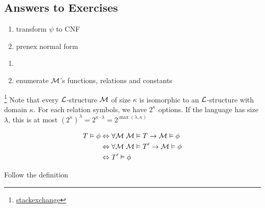 \documentclass[11pt]{article}
\begin{document}
\subsection{Answers to Exercises}
\label{sec:orgb25d3e8}
\begin{exercise}
\begin{enumerate}
\item transform \(\psi\) to CNF
\item prenex normal form
\end{enumerate}
\end{exercise}
\begin{exercise}
\begin{enumerate}
\item {}
\item enumerate \(\mathcal{M}\)'s functions, relations and constants
\end{enumerate}
\end{exercise}
\begin{exercise}
\footnote{\href{https://math.stackexchange.com/questions/1170953/let-alpha-be-any-cardinal-there-are-at-most-2-alpha-cup-mathscrl}{stackexchange}}
Note that every \(\mathcal{L}\)-structure \(\mathcal{M}\) of size \(\kappa\) is isomorphic to an
\(\mathcal{L}\)-structure with domain \(\kappa\). For each relation symbols, we have \(2^\kappa\)
options. If the language has size \(\lambda\), this is at most 
\((2^\kappa)^\lambda=2^{\kappa\cdot\lambda}=2^{\max(\lambda,\kappa)}\)
\end{exercise}

\begin{exercise}
\begin{align*}
T\vDash\phi&\Leftrightarrow\forall \mathcal{M}\;\mathcal{M}\vDash T\to\mathcal{M}\vDash\phi\\
&\Leftrightarrow\forall \mathcal{M}\;\mathcal{M}\vDash T'\to\mathcal{M}\vDash\phi\\
&\Leftrightarrow T'\vDash\phi
\end{align*}
\end{exercise}
\begin{exercise}
Follow the definition
\end{exercise}
\end{document}
